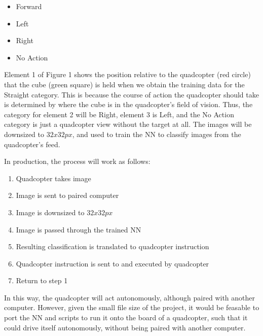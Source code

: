 \documentclass[12pt]{article}
\begin{document}
{	\begin{itemize}
		\item Forward
		\item Left
		\item Right
		\item No Action
	\end{itemize}

	\quad Element 1 of Figure 1 shows the position relative to the quadcopter (red circle) that the cube (green square) is held when we obtain the training data for the Straight category. 
	This is because the course of action the quadcopter should take is determined by where the cube is in the quadcopter's field of vision. 
	Thus, the category for element 2 will be Right, element 3 is Left, and the No Action category is just a quadcopter view without the target at all. 
	The images will be downsized to $32x32px$, and used to train the NN to classify images from the quadcopter's feed. \newline

	\quad In production, the process will work as follows:
	
	\begin{enumerate}
		\item{Quadcopter takes image}
		\item{Image is sent to paired computer}
		\item{Image is downsized to $32x32px$}
		\item{Image is passed through the trained NN}
		\item{Resulting classification is translated to quadcopter instruction}
		\item{Quadcopter instruction is sent to and executed by quadcopter}	
		\item{Return to step 1}
	\end{enumerate}
	
	\quad In this way, the quadcopter will act autonomously, although paired with another computer. 
	However, given the small file size of the project, it would be feasable to port the NN and scripts to run it onto the board of a quadcopter, such that it could drive itself autonomously, without being paired with another computer.

}
\end{document}
